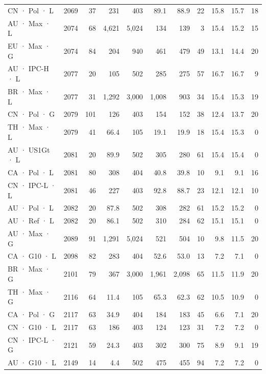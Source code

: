 \begin{tabular}{lrrrrrrrrrr}
CN · Pol · L & 2069 & 37 & 231 & 403 & 89.1 & 88.9 & 22 & 15.8 & 15.7 & 18 \\
AU · Max · L & 2074 & 68 & 4,621 & 5,024 & 134 & 139 & 3 & 15.4 & 15.2 & 15 \\
EU · Max · G & 2074 & 84 & 204 & 940 & 461 & 479 & 49 & 13.1 & 14.4 & 20 \\
AU · IPC-H · L & 2077 & 20 & 105 & 502 & 285 & 275 & 57 & 16.7 & 16.7 & 9 \\
BR · Max · L & 2077 & 31 & 1,292 & 3,000 & 1,008 & 903 & 34 & 15.4 & 15.3 & 19 \\
CN · Pol · G & 2079 & 101 & 126 & 403 & 154 & 152 & 38 & 12.4 & 13.7 & 20 \\
TH · Max · L & 2079 & 41 & 66.4 & 105 & 19.1 & 19.9 & 18 & 15.4 & 15.3 & 0 \\
AU · US1Gt · L & 2081 & 20 & 89.9 & 502 & 305 & 280 & 61 & 15.4 & 15.4 & 0 \\
CA · Pol · L & 2081 & 80 & 308 & 404 & 40.8 & 39.8 & 10 & 9.1 & 9.1 & 16 \\
CN · IPC-L · L & 2081 & 46 & 227 & 403 & 92.8 & 88.7 & 23 & 12.1 & 12.1 & 10 \\
AU · Pol · L & 2082 & 20 & 87.8 & 502 & 308 & 282 & 61 & 15.2 & 15.2 & 0 \\
AU · Ref · L & 2082 & 20 & 86.1 & 502 & 310 & 284 & 62 & 15.1 & 15.1 & 0 \\
AU · Max · G & 2089 & 91 & 1,291 & 5,024 & 521 & 504 & 10 & 9.8 & 11.5 & 20 \\
CA · G10 · L & 2098 & 82 & 283 & 404 & 52.6 & 53.0 & 13 & 7.2 & 7.1 & 0 \\
BR · Max · G & 2101 & 79 & 367 & 3,000 & 1,961 & 2,098 & 65 & 11.5 & 11.9 & 20 \\
TH · Max · G & 2116 & 64 & 11.4 & 105 & 65.3 & 62.3 & 62 & 10.5 & 10.9 & 0 \\
CA · Pol · G & 2117 & 63 & 34.9 & 404 & 184 & 183 & 45 & 6.6 & 7.1 & 20 \\
CN · G10 · L & 2117 & 63 & 186 & 403 & 124 & 123 & 31 & 7.2 & 7.2 & 0 \\
CN · IPC-L · G & 2121 & 59 & 24.3 & 403 & 302 & 300 & 75 & 8.9 & 9.1 & 19 \\
AU · G10 · L & 2149 & 14 & 4.4 & 502 & 475 & 455 & 94 & 7.2 & 7.2 & 0 \\
\bottomrule
\end{tabular}
